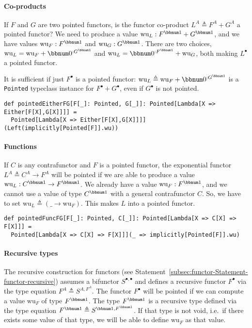 \paragraph{Co-products}

If $F$ and $G$ are two pointed functors, is the functor co-product
$L^{A}\triangleq F^{A}+G^{A}$ a pointed functor? We need to produce
a value $\text{wu}_{L}:F^{\bbnum 1}+G^{\bbnum 1}$, and we have values
$\text{wu}_{F}:F^{\bbnum 1}$ and $\text{wu}_{G}:G^{\bbnum 1}$. There
are two choices, $\text{wu}_{L}=\text{wu}_{F}+\bbnum 0^{:G^{\bbnum 1}}$
and $\text{wu}_{L}=\bbnum 0^{:F^{\bbnum 1}}+\text{wu}_{G}$, both
making $L^{\bullet}$ a pointed functor. 

It is sufficient if just $F^{\bullet}$ is a pointed functor: $\text{wu}_{L}\triangleq\text{wu}_{F}+\bbnum 0^{:G^{\bbnum 1}}$
is a \lstinline!Pointed! typeclass instance for $F^{\bullet}+G^{\bullet}$,
even if $G^{\bullet}$ is not pointed.
\begin{lstlisting}
def pointedEitherFG[F[_]: Pointed, G[_]]: Pointed[Lambda[X => Either[F[X],G[X]]]] =
  Pointed[Lambda[X => Either[F[X],G[X]]]](Left(implicitly[Pointed[F]].wu))
\end{lstlisting}


\paragraph{Functions}

If $C$ is any contrafunctor and $F$ is a pointed functor, the exponential
functor $L^{A}\triangleq C^{A}\rightarrow F^{A}$ will be pointed
if we are able to produce a value $\text{wu}_{L}:C^{\bbnum 1}\rightarrow F^{\bbnum 1}$.
We already have a value $\text{wu}_{F}:F^{\bbnum 1}$, and we cannot
use a value of type $C^{\bbnum 1}$ with a general contrafunctor $C$.
So, we have to set $\text{wu}_{L}\triangleq(\_\rightarrow\text{wu}_{F})$.
This makes $L$ into a pointed functor.
\begin{lstlisting}
def pointedFuncFG[F[_]: Pointed, C[_]]: Pointed[Lambda[X => C[X] => F[X]]] =
  Pointed[Lambda[X => C[X] => F[X]]](_ => implicitly[Pointed[F]].wu)
\end{lstlisting}


\paragraph{Recursive types}

The recursive construction for functors (see Statement~\ref{subsec:functor-Statement-functor-recursive})
assumes a bifunctor $S^{\bullet,\bullet}$ and defines a recursive
functor $F^{\bullet}$ via the type equation $F^{A}\triangleq S^{A,F^{A}}$.
The functor $F^{\bullet}$ will be pointed if we can compute a value
$\text{wu}_{F}$ of type $F^{\bbnum 1}$. The type $F^{\bbnum 1}$
is a recursive type defined via the type equation $F^{\bbnum 1}\triangleq S^{\bbnum 1,F^{\bbnum 1}}$.
If that type is not void, i.e.~if there exists some value of that
type, we will be able to define $\text{wu}_{F}$ as that value. 

